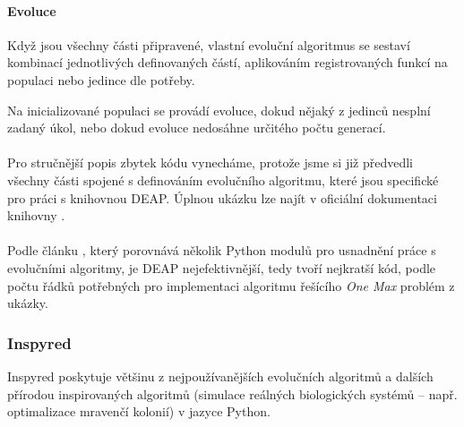 \paragraph{Evoluce}
Když jsou všechny části připravené, vlastní evoluční algoritmus se sestaví
kombinací jednotlivých definovaných částí, aplikováním registrovaných funkcí na
populaci nebo jedince dle potřeby. 

Na inicializované populaci se provádí evoluce, dokud nějaký z jedinců
nesplní zadaný úkol, nebo dokud evoluce nedosáhne určitého počtu generací. 

\paragraph{}
Pro stručnější popis zbytek kódu vynecháme, protože jsme si již předvedli
všechny části spojené s definováním evolučního algoritmu, které jsou specifické
pro práci s knihovnou DEAP. Úplnou ukázku lze najít v oficiální dokumentaci
knihovny \citep{deapproject}.

\paragraph{}
Podle článku \citep{fortin2012deap}, který porovnává několik Python modulů pro
usnadnění práce s evolučními algoritmy, je DEAP nejefektivnější,
tedy tvoří nejkratší kód, podle počtu řádků potřebných pro implementaci
algoritmu řešícího  \emph{One Max} problém z ukázky.

\subsubsection{Inspyred} \label{Inspyred}

Inspyred \citep{InspyredDocs} poskytuje většinu z nejpoužívanějších evolučních
algoritmů a dalších přírodou inspirovaných algoritmů (simulace reálných
biologických systémů -- např. optimalizace mravenčí kolonií) v jazyce Python. 

